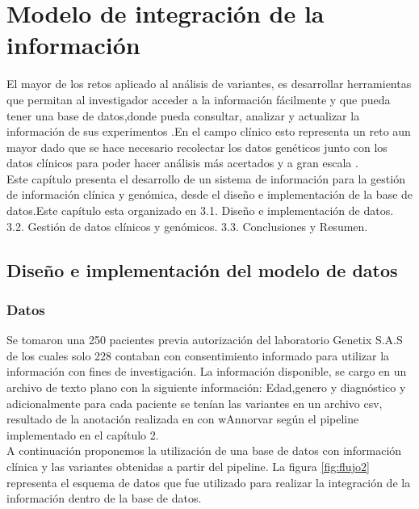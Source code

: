 \chapter{Modelo de integración de la información}

El mayor de los retos aplicado al análisis de variantes, es desarrollar herramientas que permitan al investigador acceder a la información fácilmente y que pueda tener una base de datos,donde pueda consultar, analizar y actualizar la información de sus experimentos \cite{Li2014}.En el campo clínico esto representa un reto aun mayor dado que se hace necesario recolectar los datos genéticos junto con los datos clínicos para poder hacer análisis más acertados y a gran escala \cite{Paila2013}.\\


Este capítulo presenta el desarrollo de un sistema de información para la gestión de información clínica y genómica, desde el diseño e implementación de la base de datos.Este capítulo esta   organizado en 3.1. Diseño e implementación de datos. 3.2. Gestión de datos clínicos y genómicos. 3.3. Conclusiones y  Resumen.

\section{Diseño e implementación del modelo de datos}

\subsection{Datos}

Se tomaron una  250 pacientes previa autorización  del laboratorio Genetix S.A.S de los cuales solo 228 contaban con consentimiento informado para utilizar la información con fines de investigación.  La información disponible, se cargo en un archivo de texto plano con la siguiente información: Edad,genero y diagnóstico y adicionalmente para cada paciente se tenían las variantes en un archivo csv, resultado de la anotación realizada en con wAnnorvar según el pipeline implementado en el capítulo 2.\\

A continuación proponemos la utilización de una base de datos con información clínica  y las variantes obtenidas a partir del pipeline. La figura \ref{fig:flujo2} representa el esquema de datos que fue utilizado para realizar la integración de la información dentro de la base de datos. \\

